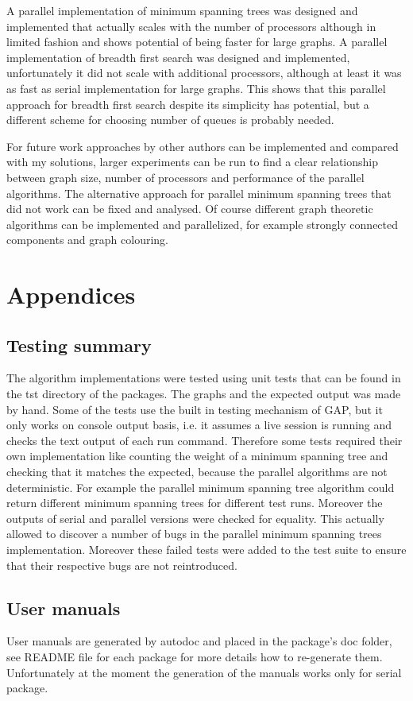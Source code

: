 \documentclass{report}
\theoremstyle{plain}
\theoremstyle{definition}
\theoremstyle{remark}
\begin{document}
A parallel implementation of minimum spanning trees was designed and implemented that actually scales with the number of processors although in limited fashion and shows potential of being faster for large graphs. A parallel implementation of breadth first search was designed and implemented, unfortunately it did not scale with additional processors, although at least it was as fast as serial implementation for large graphs. This shows that this parallel approach for breadth first search despite its simplicity has potential, but a different scheme for choosing number of queues is probably needed.

For future work approaches by other authors can be implemented and compared with my solutions, larger experiments can be run to find a clear relationship between graph size, number of processors and performance of the parallel algorithms. The alternative approach for parallel minimum spanning trees that did not work can be fixed and analysed. Of course different graph theoretic algorithms can be implemented and parallelized, for example strongly connected components and graph colouring.

\chapter{Appendices}

\section{Testing summary}

The algorithm implementations were tested using unit tests that can be found in the tst directory of the packages. The graphs and the expected output was made by hand. Some of the tests use the built in testing mechanism of GAP, but it only works on console output basis, i.e. it assumes a live session is running and checks the text output of each run command. Therefore some tests required their own implementation like counting the weight of a minimum spanning tree and checking that it matches the expected, because the parallel algorithms are not deterministic. For example the parallel minimum spanning tree algorithm could return different minimum spanning trees for different test runs. Moreover the outputs of serial and parallel versions were checked for equality. This actually allowed to discover a number of bugs in the parallel minimum spanning trees implementation. Moreover these failed tests were added to the test suite to ensure that their respective bugs are not reintroduced.

\section{User manuals}

User manuals are generated by autodoc and placed in the package's doc folder, see README file for each package for more details how to re-generate them. Unfortunately at the moment the generation of the manuals works only for serial package.



\end{document}
